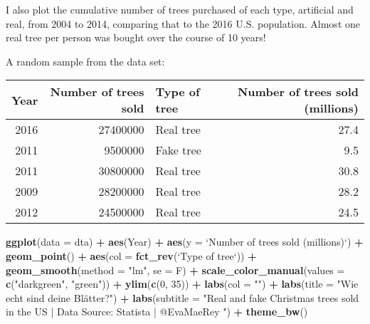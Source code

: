 \documentclass[]{book}
\newenvironment{Shaded}{\begin{snugshade}}{\end{snugshade}}
\newcommand{\KeywordTok}[1]{\textcolor[rgb]{0.13,0.29,0.53}{\textbf{#1}}}
\newcommand{\DataTypeTok}[1]{\textcolor[rgb]{0.13,0.29,0.53}{#1}}
\newcommand{\DecValTok}[1]{\textcolor[rgb]{0.00,0.00,0.81}{#1}}
\newcommand{\StringTok}[1]{\textcolor[rgb]{0.31,0.60,0.02}{#1}}
\newcommand{\OperatorTok}[1]{\textcolor[rgb]{0.81,0.36,0.00}{\textbf{#1}}}
\newcommand{\NormalTok}[1]{#1}
\theoremstyle{definition}
\theoremstyle{definition}
\theoremstyle{definition}
\theoremstyle{remark}
\begin{document}
I also plot the cumulative number of trees purchased of each type,
artificial and real, from 2004 to 2014, comparing that to the 2016 U.S.
population. Almost one real tree per person was bought over the course
of 10 years!

A random sample from the data set:

\begin{tabular}{r|r|l|r}
\hline
Year & Number of trees sold & Type of tree & Number of trees sold (millions)\\
\hline
2016 & 27400000 & Real tree & 27.4\\
\hline
2011 & 9500000 & Fake tree & 9.5\\
\hline
2011 & 30800000 & Real tree & 30.8\\
\hline
2009 & 28200000 & Real tree & 28.2\\
\hline
2012 & 24500000 & Real tree & 24.5\\
\hline
\end{tabular}

\begin{Shaded}
\begin{Highlighting}[]
\KeywordTok{ggplot}\NormalTok{(}\DataTypeTok{data =}\NormalTok{ dta) }\OperatorTok{+}
\StringTok{  }\KeywordTok{aes}\NormalTok{(Year) }\OperatorTok{+}
\StringTok{  }\KeywordTok{aes}\NormalTok{(}\DataTypeTok{y =} \StringTok{`}\DataTypeTok{Number of trees sold (millions)}\StringTok{`}\NormalTok{) }\OperatorTok{+}
\StringTok{  }\KeywordTok{geom_point}\NormalTok{() }\OperatorTok{+}
\StringTok{  }\KeywordTok{aes}\NormalTok{(}\DataTypeTok{col =} \KeywordTok{fct_rev}\NormalTok{(}\StringTok{`}\DataTypeTok{Type of tree}\StringTok{`}\NormalTok{)) }\OperatorTok{+}
\StringTok{  }\KeywordTok{geom_smooth}\NormalTok{(}\DataTypeTok{method =} \StringTok{"lm"}\NormalTok{, }\DataTypeTok{se =}\NormalTok{ F) }\OperatorTok{+}
\StringTok{  }\KeywordTok{scale_color_manual}\NormalTok{(}\DataTypeTok{values =} \KeywordTok{c}\NormalTok{(}\StringTok{"darkgreen"}\NormalTok{, }\StringTok{"green"}\NormalTok{)) }\OperatorTok{+}
\StringTok{  }\KeywordTok{ylim}\NormalTok{(}\KeywordTok{c}\NormalTok{(}\DecValTok{0}\NormalTok{, }\DecValTok{35}\NormalTok{)) }\OperatorTok{+}
\StringTok{  }\KeywordTok{labs}\NormalTok{(}\DataTypeTok{col =} \StringTok{""}\NormalTok{) }\OperatorTok{+}
\StringTok{  }\KeywordTok{labs}\NormalTok{(}\DataTypeTok{title =} \StringTok{"Wie echt sind deine Blätter?"}\NormalTok{) }\OperatorTok{+}
\StringTok{  }\KeywordTok{labs}\NormalTok{(}\DataTypeTok{subtitle =} \StringTok{"Real and fake Christmas trees sold in the US | Data Source: Statista | @EvaMaeRey "}\NormalTok{) }\OperatorTok{+}
\StringTok{  }\KeywordTok{theme_bw}\NormalTok{() }
\end{Highlighting}
\end{Shaded}
\end{document}
